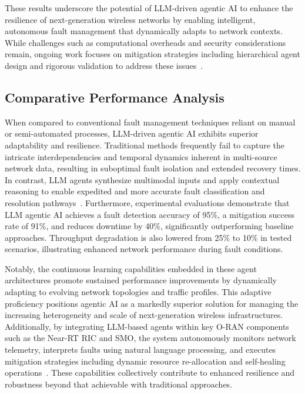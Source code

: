 \documentclass[sigconf]{acmart}
\begin{document}
These results underscore the potential of LLM-driven agentic AI to enhance the resilience of next-generation wireless networks by enabling intelligent, autonomous fault management that dynamically adapts to network contexts. While challenges such as computational overheads and security considerations remain, ongoing work focuses on mitigation strategies including hierarchical agent design and rigorous validation to address these issues~\cite{ref55}.

\subsection{Comparative Performance Analysis}

When compared to conventional fault management techniques reliant on manual or semi-automated processes, LLM-driven agentic AI exhibits superior adaptability and resilience. Traditional methods frequently fail to capture the intricate interdependencies and temporal dynamics inherent in multi-source network data, resulting in suboptimal fault isolation and extended recovery times. In contrast, LLM agents synthesize multimodal inputs and apply contextual reasoning to enable expedited and more accurate fault classification and resolution pathways~\cite{ref55}. Furthermore, experimental evaluations demonstrate that LLM agentic AI achieves a fault detection accuracy of 95\%, a mitigation success rate of 91\%, and reduces downtime by 40\%, significantly outperforming baseline approaches. Throughput degradation is also lowered from 25\% to 10\% in tested scenarios, illustrating enhanced network performance during fault conditions.

Notably, the continuous learning capabilities embedded in these agent architectures promote sustained performance improvements by dynamically adapting to evolving network topologies and traffic profiles. This adaptive proficiency positions agentic AI as a markedly superior solution for managing the increasing heterogeneity and scale of next-generation wireless infrastructures. Additionally, by integrating LLM-based agents within key O-RAN components such as the Near-RT RIC and SMO, the system autonomously monitors network telemetry, interprets faults using natural language processing, and executes mitigation strategies including dynamic resource re-allocation and self-healing operations~\cite{ref55}. These capabilities collectively contribute to enhanced resilience and robustness beyond that achievable with traditional approaches.
\end{document}
